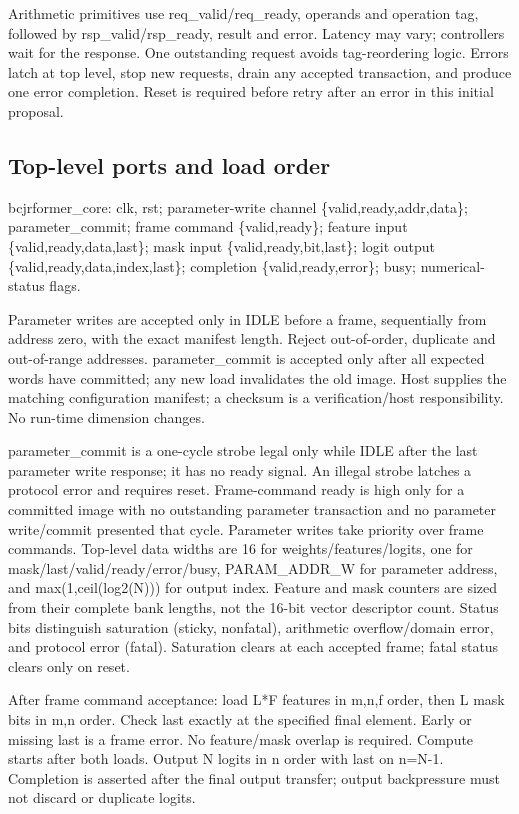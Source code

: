 \documentclass[11pt,a4paper]{article}
\begin{document}
Arithmetic primitives use req\_valid/req\_ready, operands and operation tag, followed by rsp\_valid/rsp\_ready, result and error. Latency may vary; controllers wait for the response. One outstanding request avoids tag-reordering logic. Errors latch at top level, stop new requests, drain any accepted transaction, and produce one error completion. Reset is required before retry after an error in this initial proposal.

\subsection{Top-level ports and load order}
bcjrformer\_core: clk, rst; parameter-write channel \{valid,ready,addr,data\}; parameter\_commit; frame command \{valid,ready\}; feature input \{valid,ready,data,last\}; mask input \{valid,ready,bit,last\}; logit output \{valid,ready,data,index,last\}; completion \{valid,ready,error\}; busy; numerical-status flags.

Parameter writes are accepted only in IDLE before a frame, sequentially from address zero, with the exact manifest length. Reject out-of-order, duplicate and out-of-range addresses. parameter\_commit is accepted only after all expected words have committed; any new load invalidates the old image. Host supplies the matching configuration manifest; a checksum is a verification/host responsibility. No run-time dimension changes.

parameter\_commit is a one-cycle strobe legal only while IDLE after the last parameter write response; it has no ready signal. An illegal strobe latches a protocol error and requires reset. Frame-command ready is high only for a committed image with no outstanding parameter transaction and no parameter write/commit presented that cycle. Parameter writes take priority over frame commands. Top-level data widths are 16 for weights/features/logits, one for mask/last/valid/ready/error/busy, PARAM\_ADDR\_W for parameter address, and max(1,ceil(log2(N))) for output index. Feature and mask counters are sized from their complete bank lengths, not the 16-bit vector descriptor count. Status bits distinguish saturation (sticky, nonfatal), arithmetic overflow/domain error, and protocol error (fatal). Saturation clears at each accepted frame; fatal status clears only on reset.

After frame command acceptance: load L*F features in m,n,f order, then L mask bits in m,n order. Check last exactly at the specified final element. Early or missing last is a frame error. No feature/mask overlap is required. Compute starts after both loads. Output N logits in n order with last on n=N-1. Completion is asserted after the final output transfer; output backpressure must not discard or duplicate logits.
\end{document}
